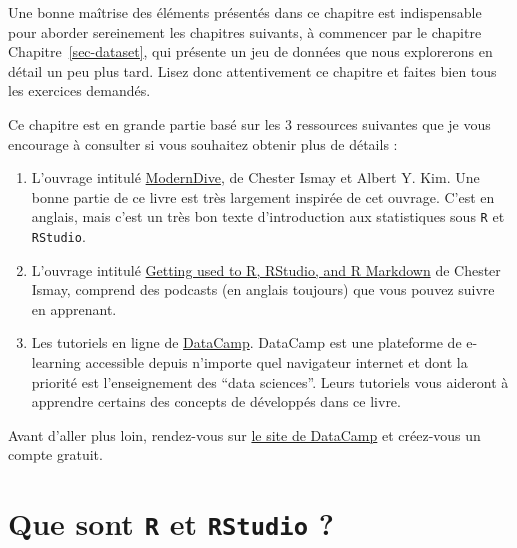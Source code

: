 \documentclass[
  a4paper,
  DIV=11,
  numbers=noendperiod,
  oneside]{scrreprt}
\providecommand{\tightlist}{%
  \setlength{\itemsep}{0pt}\setlength{\parskip}{0pt}}\usepackage{longtable,booktabs,array}
\begin{document}
Une bonne maîtrise des éléments présentés dans ce chapitre est
indispensable pour aborder sereinement les chapitres suivants, à
commencer par le chapitre Chapitre~\ref{sec-dataset}, qui présente un
jeu de données que nous explorerons en détail un peu plus tard. Lisez
donc attentivement ce chapitre et faites bien tous les exercices
demandés.

Ce chapitre est en grande partie basé sur les 3 ressources suivantes que
je vous encourage à consulter si vous souhaitez obtenir plus de détails
:

\begin{enumerate}
\def\labelenumi{\arabic{enumi}.}
\tightlist
\item
  L'ouvrage intitulé
  \href{https://moderndive.com/index.html}{ModernDive}, de Chester Ismay
  et Albert Y. Kim. Une bonne partie de ce livre est très largement
  inspirée de cet ouvrage. C'est en anglais, mais c'est un très bon
  texte d'introduction aux statistiques sous \texttt{R} et
  \texttt{RStudio}.
\item
  L'ouvrage intitulé
  \href{https://ismayc.github.io/rbasics-book/}{Getting used to R,
  RStudio, and R Markdown} de Chester Ismay, comprend des podcasts (en
  anglais toujours) que vous pouvez suivre en apprenant.
\item
  Les tutoriels en ligne de \href{https://datacamp.com/}{DataCamp}.
  DataCamp est une plateforme de e-learning accessible depuis n'importe
  quel navigateur internet et dont la priorité est l'enseignement des
  ``data sciences''. Leurs tutoriels vous aideront à apprendre certains
  des concepts de développés dans ce livre.
\end{enumerate}

\begin{tcolorbox}[enhanced jigsaw, colbacktitle=quarto-callout-important-color!10!white, left=2mm, leftrule=.75mm, titlerule=0mm, bottomtitle=1mm, colback=white, breakable, arc=.35mm, bottomrule=.15mm, toprule=.15mm, toptitle=1mm, opacitybacktitle=0.6, title=\textcolor{quarto-callout-important-color}{\faExclamation}\hspace{0.5em}{Important}, coltitle=black, rightrule=.15mm, opacityback=0, colframe=quarto-callout-important-color-frame]

Avant d'aller plus loin, rendez-vous sur
\href{https://www.datacamp.com/}{le site de DataCamp} et créez-vous un
compte gratuit.

\end{tcolorbox}

\section{\texorpdfstring{Que sont \texttt{R} et \texttt{RStudio}
?}{Que sont R et RStudio ?}}\label{que-sont-r-et-rstudio}
\end{document}
